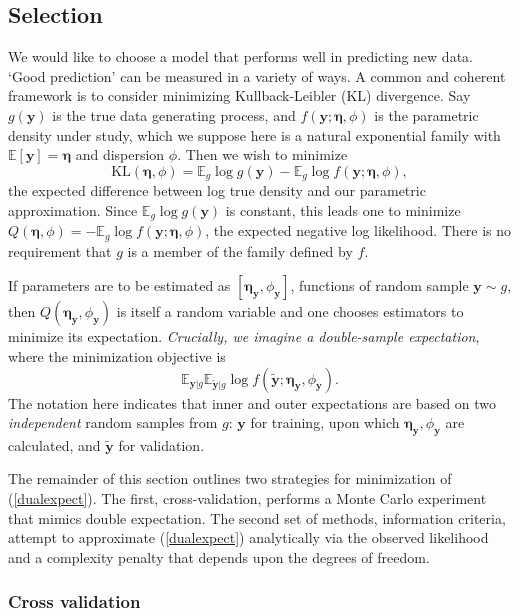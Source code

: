 \documentclass[12pt]{article}
\newcommand{\bs}[1]{\boldsymbol{#1}}
\newcommand{\mr}[1]{\mathrm{#1}}
\newcommand{\bm}[1]{\mathbf{#1}}
\newcommand{\ds}[1]{\mathds{#1}}
\begin{document}
\subsection{Selection}


We would like to choose a model that performs well in predicting new data.
 `Good prediction' can be measured in a variety of ways.  A common and
 coherent framework is to consider minimizing Kullback-Leibler (KL)
 divergence.  Say $g(\bm{y})$ is the true data generating process, and
 $f(\bm{y}; \bs{\eta},\phi)$ is the parametric density under study, which we
 suppose here is a natural exponential family  with $\ds{E}[\bm{y}]=\bs{\eta}$
 and dispersion $\phi$. Then we wish to minimize
\begin{equation}
\mr{KL}(\bs{\eta},\phi) = \ds{E}_g \log g(\bm{y}) - \ds{E}_g \log f(\bm{y}; \bs{\eta},\phi),
\end{equation}
the expected difference between log true density and our parametric approximation.  Since $\ds{E}_g \log g(\bm{y})$ is constant, this leads one to minimize 
$Q(\bs{\eta},\phi) = -\ds{E}_g \log f(\bm{y}; \bs{\eta},\phi)$, the expected negative log likelihood.   There is no requirement that $g$ is a member of the family defined by $f$.

If parameters are to be estimated as $[\bs{\eta}_{\bm{y}},\phi_{\bm{y}}]$, functions of random sample $\bm{y} \sim g$, then $Q(\bs{\eta}_{\bm{y}},\phi_{\bm{y}})$ is itself a random variable and one chooses estimators to minimize its expectation.  {\it Crucially, we imagine a double-sample expectation}, where the minimization objective is
\begin{equation}\label{dualexpect}
\ds{E}_{\bm{y}|g} \ds{E}_{\bm{\tilde y}|g} \log f(\bm{\tilde y}; \bs{\eta}_{\bm{y}},\phi_{\bm{y}}).
\end{equation}
The notation here indicates that inner and outer expectations are based on two {\it independent} random samples from $g$: $\bm{y}$ for training, upon which $\bs{\eta}_{\bm{y}},\phi_{\bm{y}}$ are calculated, and $\bm{\tilde y}$ for validation.  

The remainder of this section outlines two strategies for minimization of (\ref{dualexpect}).  The first, cross-validation, performs a Monte Carlo experiment that mimics double expectation.  The second set of methods, information criteria, attempt to approximate (\ref{dualexpect}) analytically via the observed likelihood and a complexity penalty that depends upon the degrees of freedom.

\subsubsection{Cross validation}
\label{cv}
\end{document}
